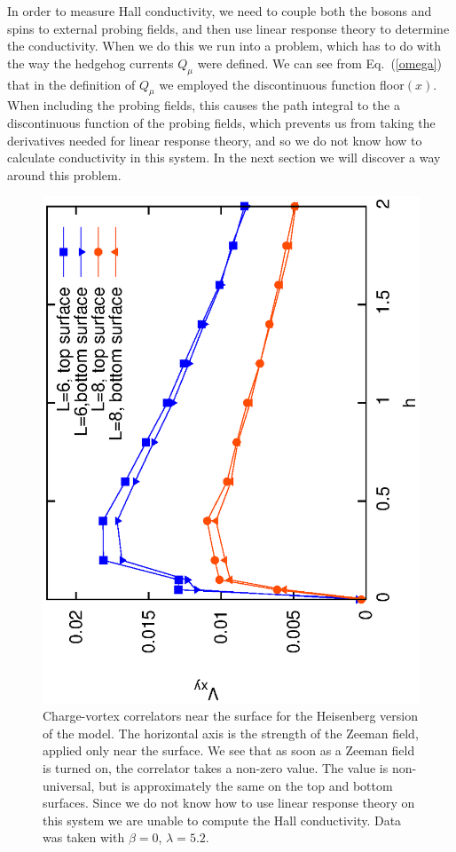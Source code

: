 \documentclass[prb,twocolumn]{revtex4-1}
\begin{document}
In order to measure Hall conductivity, we need to couple both the bosons and spins to external probing fields, and then use linear response theory to determine the conductivity. When we do this we run into a problem, which has to do with the way the hedgehog currents $Q_\mu$ were defined. We can see from Eq.~(\ref{omega}) that in the definition of $Q_\mu$ we employed the discontinuous function floor$(x)$. When including the probing fields, this causes the path integral to the a discontinuous function of the probing fields, which prevents us from taking the derivatives needed for linear response theory, and so we do not know how to calculate conductivity in this system. In the next section we will discover a way around this problem.

\begin{figure}
\includegraphics[angle=-90,width=0.9\linewidth]{figures/vortexcor.eps}
\caption{Charge-vortex correlators near the surface for the Heisenberg version of the model. The horizontal axis is the strength of the Zeeman field, applied only near the surface. We see that as soon as a Zeeman field is turned on, the correlator takes a non-zero value. The value is non-universal, but is approximately the same on the top and bottom surfaces. Since we do not know how to use linear response theory on this system we are unable to compute the Hall conductivity. Data was taken with $\beta=0$, $\lambda=5.2$.}
\label{heishall}
\end{figure}
\end{document}
